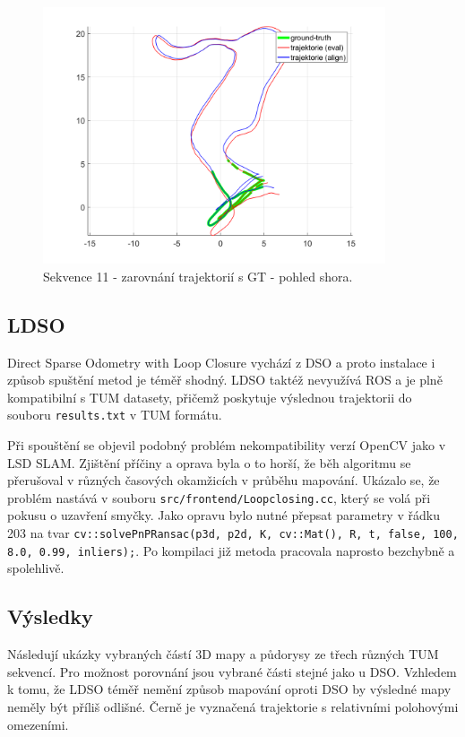 \documentclass[12pt,a4paper]{report}
\begin{document}
\begin{figure}[H]
\centering
\includegraphics[width=0.9\textwidth]{img/m_dso_11_2.png}
\caption{Sekvence 11 - zarovnání trajektorií s GT - pohled shora.}
\end{figure}


\subsection{LDSO}
Direct Sparse Odometry with Loop Closure vychází z DSO a proto instalace i způsob spuštění metod je téměř shodný. LDSO taktéž nevyužívá ROS a je plně kompatibilní s TUM datasety, přičemž poskytuje výslednou trajektorii do souboru \texttt{results.txt} v TUM formátu.

Při spouštění se objevil podobný problém nekompatibility verzí OpenCV jako v LSD SLAM. Zjištění příčiny a oprava byla o to horší, že běh algoritmu se přerušoval v různých časových okamžicích v průběhu mapování. Ukázalo se, že problém nastává v souboru \texttt{src/frontend/Loopclosing.cc}, který se volá při pokusu o uzavření smyčky. Jako opravu bylo nutné přepsat parametry v řádku 203 na tvar \texttt{cv::solvePnPRansac(p3d, p2d, K, cv::Mat(), R, t, false, 100, 8.0, 0.99, inliers);}. Po kompilaci již metoda pracovala naprosto bezchybně a spolehlivě.

\subsection*{Výsledky}
Následují ukázky vybraných částí 3D mapy a půdorysy ze třech různých TUM sekvencí. Pro možnost porovnání jsou vybrané části stejné jako u DSO. Vzhledem k tomu, že LDSO téměř nemění způsob mapování oproti DSO by výsledné mapy neměly být příliš odlišné. Černě je vyznačená trajektorie s relativními polohovými omezeními.
\end{document}
